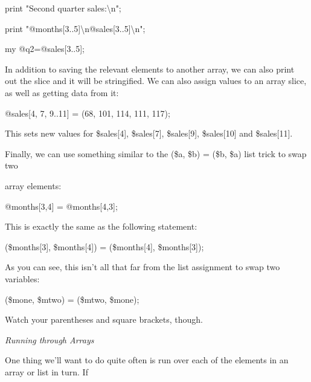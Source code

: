 \documentclass[a4paper,11pt]{book}
\begin{document}
\noindent 

\noindent 

\noindent print "Second quarter sales:\textbackslash n";

\noindent print "@months[3..5]\textbackslash n@sales[3..5]\textbackslash n";

\noindent my @q2=@sales[3..5];

\noindent 

\noindent In addition to saving the relevant elements to another array, we can also print out the slice and it will be stringified. We can also assign values to an array slice, as well as getting data from it:

\noindent 

\noindent @sales[4, 7, 9..11] = (68, 101, 114, 111, 117);

\noindent 

\noindent This sets new values for \$sales[4], \$sales[7], \$sales[9], \$sales[10] and \$sales[11].

\noindent 

\noindent 

\noindent Finally, we can use something similar to the (\$a, \$b) = (\$b, \$a) list trick to swap two

\noindent array elements:

\noindent 

\noindent 

\noindent @months[3,4] = @months[4,3];

\noindent 

\noindent This is exactly the same as the following statement:

\noindent 

\noindent 

\noindent (\$months[3], \$months[4]) = (\$months[4], \$months[3]);

\noindent 

\noindent As you can see, this isn't all that far from the list assignment to swap two variables:

\noindent 

\noindent 

\noindent (\$mone, \$mtwo) = (\$mtwo, \$mone);

\noindent 

\noindent Watch your parentheses and square brackets, though.

\noindent 

\noindent \textit{Running through Arrays}

\noindent One thing we'll want to  do quite  often  is  run  over  each  of  the elements  in  an  array  or  list in  turn.  If
\end{document}
